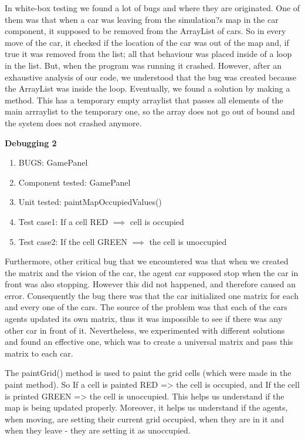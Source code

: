In white-box testing we found a lot of bugs and where they are originated. One of them was that when a car was leaving from the simulation?s map in the car component, it supposed to be removed from the ArrayList of cars. So in every move of the car, it checked if the location of the car was out of the map and, if true it was removed from the list; all that behaviour was placed inside of a loop in the list. But, when the program was running it crashed. However, after an exhaustive analysis of our code, we understood that the bug was created because the ArrayList was inside the loop. Eventually, we found a solution by making a method. This has a temporary empty arraylist that passes all elements of the main arrraylist to the temporary one, so the array does not go out of bound and the system does not crashed anymore. \newline

\textbf{Debugging 2}
\begin{enumerate}
\item {BUGS:} GamePanel
\item Component tested: GamePanel
\item Unit tested: paintMapOccupiedValues()
\item Test case1: If a cell RED $\implies$ cell is occupied %
\item Test case2: If the cell GREEN $\implies$ the cell is unoccupied
\end{enumerate} 

Furthermore, other critical bug that we encountered was that when we created the matrix and the vision of the car, the agent car supposed stop when the car in front was also stopping. However this did not happened, and therefore caused an error. Consequently the bug there was that the car initialized one matrix for each and every one of the cars. The source of the problem was that each of the cars agents updated its own matrix, thus it was impossible to see if there was any other car in front of it. Nevertheless, we experimented with different solutions and found an effective one, which was to create a universal matrix and pass this matrix to each car.\newline

The paintGrid() method is used to paint the grid cells (which were made in the paint method). So If a cell is painted RED => the cell is occupied, and If the cell is printed GREEN => the cell is unoccupied. This helps us understand if the map is being updated properly. Moreover, it helps us understand if the agents, when moving, are setting their current grid occupied, when they are in it and when they leave - they are setting it as unoccupied. \newline

